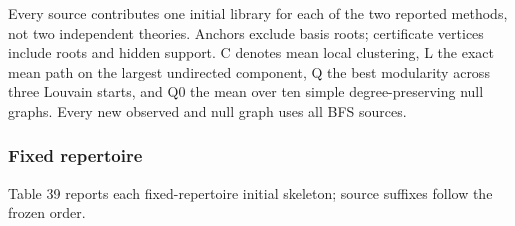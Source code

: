 \documentclass[pdflatex,sn-basic,Numbered]{sn-jnl}
\begin{document}
Every source contributes one initial library for each of the two reported methods, not two independent theories. Anchors exclude basis roots; certificate vertices include roots and hidden support. C denotes mean local clustering, L the exact mean path on the largest undirected component, Q the best modularity across three Louvain starts, and Q0 the mean over ten simple degree-preserving null graphs. Every new observed and null graph uses all BFS sources.

\subsubsection*{Fixed repertoire}\label{fixed-repertoire}

Table 39 reports each fixed-repertoire initial skeleton; source suffixes follow the frozen order.

\begingroup
\small
\setlength{\tabcolsep}{3pt}
\renewcommand{\arraystretch}{1.13}
\end{document}
